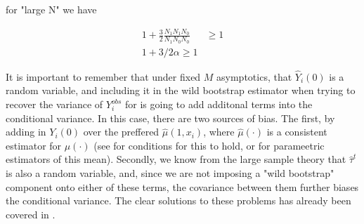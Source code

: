 \documentclass{article}
\begin{document}
for "large N" we have

\begin{align*} 1+\frac{3}{2}\frac{N_{1}N_{1}N_{0}}{N_{1}N_{0}N_{0}} &\geq 1 \\
1+3/2\alpha \geq 1
 \end{align*}

It is important to remember that under fixed $M$ asymptotics, that $\hat Y_{i}(0)$ is a random variable, and including it in the wild bootstrap estimator when trying to recover the variance of $Y_{i}^{obs}$ for is going to add additonal terms into the conditional variance. In this case, there are two sources of bias. The first, by adding in $Y_{i}(0)$ over the preffered $\hat \mu(1,x_{i})$, where $\hat \mu(\cdot)$ is a consistent estimator for $\mu(\cdot)$ (see \cite{AnI:06} for conditions for this to hold, or \cite{InR:15} for parameetric estimators of this mean). Secondly, we know from the large sample theory that $\hat \tau^{t}$ is also a random variable, and, since we are not imposing a "wild bootstrap" component onto either of these terms, the covariance between them further biases the conditional variance. The clear solutions to these problems has already been covered in \cite{OnR:16}.



\printbibliography
\end{document}
